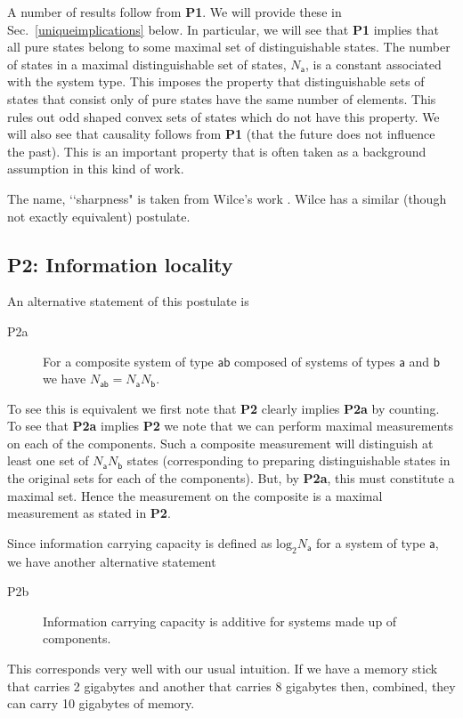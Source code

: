 \documentclass[10pt]{article}
\begin{document}
A number of results follow from {\bf P1}.  We will provide these in Sec.\ \ref{uniqueimplications} below.  In particular, we will see that {\bf P1} implies that all pure states belong to some maximal set of distinguishable states.  The number of states in a maximal distinguishable set of states, $N_\mathsf{a}$, is a constant associated with the system type.  This imposes the property that distinguishable sets of states that consist only of pure states have the same number of elements.   This rules out odd shaped convex sets of states which do not have this property.  We will also see that causality follows from {\bf P1} (that the future does not influence the past).  This is an important property that is often taken as a background assumption in this kind of work.

The name, \lq\lq sharpness" is taken from Wilce's work \cite{wilce2009four}.  Wilce has a similar (though not exactly equivalent) postulate.


\subsection{{\bf P2}: Information locality}


 An alternative statement of this postulate is
\begin{description}
\item[P2a] For a composite system of type $\mathsf{ab}$ composed of systems of types $\mathsf{a}$ and $\mathsf{b}$ we have $N_\mathsf{ab}=N_\mathsf{a}N_\mathsf{b}$.
\end{description}
To see this is equivalent we first note that {\bf P2} clearly implies {\bf P2a} by counting.  To see that {\bf P2a} implies {\bf P2} we note that we can perform maximal measurements on each of the components.  Such a composite measurement will distinguish at least one set of $N_\mathsf{a}N_\mathsf{b}$ states (corresponding to preparing distinguishable states in the original sets for each of the components).  But, by {\bf P2a}, this must constitute a maximal set.  Hence the measurement on the composite is a maximal measurement as stated in {\bf P2}.

Since information carrying capacity is defined as $\text{log}_2 N_\mathsf{a}$ for a system of type $\mathsf a$, we have another alternative statement
\begin{description}
\item[P2b] Information carrying capacity is additive for systems made up of components.
\end{description}
This corresponds very well with our usual intuition.  If we have a memory stick that carries 2 gigabytes and another that carries 8 gigabytes then, combined, they can carry 10 gigabytes of memory.
\end{document}
